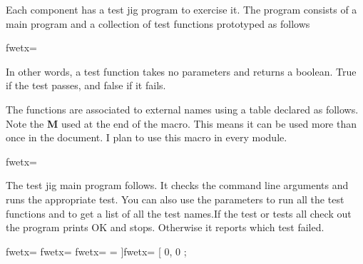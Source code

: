 
Each component has a test jig program to exercise it. The program consists
of a main program and a collection of test functions prototyped as follows

\fwbeginmacro
{}\fwequals \fwodef {}fwetx=%
\fwcdef 
\fwbeginmacronotes
{}
\fwendmacronotes
\fwendmacro


In other words, a test function takes no parameters and returns a
boolean. True if the test passes, and false if it fails.

The functions are associated to external names using a table declared
as follows. Note the {\bf M} used at the end of the macro. This means
it can be used more than once in the document.  I plan to use this
macro in every module.

\fwbeginmacro
{}\fwmany{}\fwequals \fwodef {}fwetx=%
\fwcdef 
\fwbeginmacronotes
{}
\fwendmacronotes
\fwendmacro


The test jig main program follows. It checks the command line
arguments and runs the appropriate test. You can also use the
parameters  to run all the test functions and  to get a
list of all the test names.If the test or tests all check out the
program prints OK and stops. Otherwise it reports which test failed.

\fwbeginmacro
{}\fwmany{}\fwequals \fwodef \fwbtx[
]fwetx=%
\fwbtx[
]fwetx=%
fwetx=%
\fwbtx[

static NameFcn TestTable[] = {
    ]fwetx=%
\fwbtx[
    {0, 0}
};


